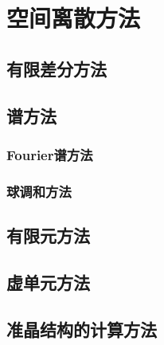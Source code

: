 \section{空间离散方法}

\subsection{有限差分方法}


\subsection{谱方法}

\subsubsection{Fourier谱方法}

\subsubsection{球调和方法}

\subsection{有限元方法}

\subsection{虚单元方法}

\subsection{准晶结构的计算方法}
